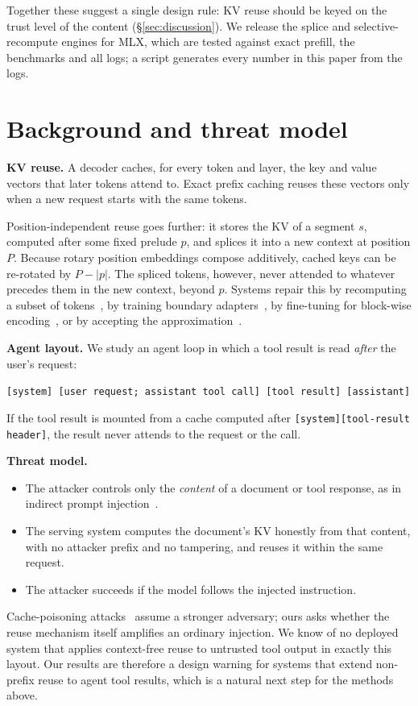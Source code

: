 \documentclass[10pt]{article}
\begin{document}
Together these suggest a single design rule: KV reuse should be keyed on the trust level of the content (\S\ref{sec:discussion}).
We release the splice and selective-recompute engines for MLX, which are tested against exact prefill, the benchmarks and all
logs; a script generates every number in this paper from the logs.

\section{Background and threat model}\label{sec:background}
\textbf{KV reuse.} A decoder caches, for every token and layer, the key and value vectors that later tokens attend to. Exact
prefix caching reuses these vectors only when a new request starts with the same tokens.

Position-independent reuse goes further: it stores the KV of a segment $s$, computed after some fixed prelude $p$, and splices
it into a new context at position $P$. Because rotary position embeddings compose additively, cached keys can be re-rotated by
$P-|p|$. The spliced tokens, however, never attended to whatever precedes them in the new context, beyond $p$. Systems repair
this by recomputing a subset of tokens~\citep{yao2025cacheblend,hu2024epic}, by training boundary
adapters~\citep{chen2026kvpacket}, by fine-tuning for block-wise encoding~\citep{ma2025blockattention,yang2025kvlink,yang2025ape},
or by accepting the approximation~\citep{li2026notes,fang2026recache,lu2024turborag}.

\textbf{Agent layout.} We study an agent loop in which a tool result is read \emph{after} the user's request:
\begin{center}\small\texttt{[system] [user request; assistant tool call] [tool result] [assistant]}\end{center}
If the tool result is mounted from a cache computed after \texttt{[system][tool-result header]}, the result never attends to the
request or the call.

\textbf{Threat model.}
\begin{itemize}
\item The attacker controls only the \emph{content} of a document or tool response, as in indirect prompt
  injection~\citep{greshake2023indirect}.
\item The serving system computes the document's KV honestly from that content, with no attacker prefix and no tampering, and
  reuses it within the same request.
\item The attacker succeeds if the model follows the injected instruction.
\end{itemize}
Cache-poisoning attacks~\citep{zhang2026hijackkv,zhu2026r2ecap} assume a stronger adversary; ours asks whether the reuse
mechanism itself amplifies an ordinary injection. We know of no deployed system that applies context-free reuse to untrusted
tool output in exactly this layout. Our results are therefore a design warning for systems that extend non-prefix reuse to agent
tool results, which is a natural next step for the methods above.
\end{document}
